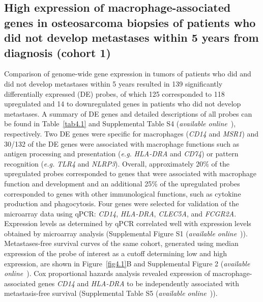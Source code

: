 \subsection{High expression of macrophage\hyp{}associated genes in osteosarcoma biopsies of patients who did not develop metastases within 5 years from diagnosis (cohort 1)}
Comparison of genome\hyp{}wide gene expression in tumors
of patients who did and did not develop metastases within
5 years resulted in 139 significantly differentially expressed
(DE) probes, of which 125 corresponded to 118 upregulated
and 14 to downregulated genes in patients who did
not develop metastases. A summary of DE genes and
detailed descriptions of all probes can be found in Table~\ref{tab4.1}
and Supplemental Table S4 ({\it available online}~\cite{ch4additional}), respectively. Two DE genes
were specific for macrophages ({\it CD14} and {\it MSR1}) and 30/132 of the DE genes were associated with macrophage
functions such as antigen processing and presentation
({\it e.g.} {\it HLA-DRA} and {\it CD74}) or pattern recognition ({\it e.g.}
{\it TLR4} and {\it NLRP3}). Overall, approximately 20\% of the
upregulated probes corresponded to genes that were associated
with macrophage function and development and an
additional 25\% of the upregulated probes corresponded to
genes with other immunological functions, such as cytokine
production and phagocytosis. Four genes were
selected for validation of the microarray data using qPCR:
{\it CD14}, {\it HLA-DRA}, {\it CLEC5A}, and {\it FCGR2A}. Expression
levels as determined by qPCR correlated well with
expression levels obtained by microarray analysis (Supplemental
Figure S1 ({\it available online}~\cite{ch4additional})). Metastases\hyp{}free survival curves of the same
cohort, generated using median expression of the probe of
interest as a cutoff determining low and high expression,
are shown in Figure~\ref{fig4.1}B and Supplemental Figure 2 ({\it available online}~\cite{ch4additional}). Cox
proportional hazards analysis revealed expression of
macrophage\hyp{}associated genes {\it CD14} and {\it HLA-DRA} to be
independently associated with metastasis\hyp{}free survival
(Supplemental Table S5 ({\it available online}~\cite{ch4additional})).
%
